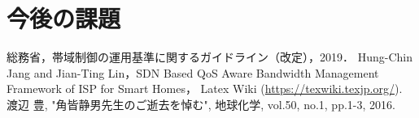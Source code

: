 \documentclass[a4paper,10pt,twocolumn,uplatex]{jsarticle}
\begin{document}
\section{今後の課題}

\footnotesize{
  \begin{thebibliography}{99}
     総務省，帯域制御の運用基準に関するガイドライン（改定），2019．
     Hung-Chin Jang and Jian-Ting Lin，SDN Based QoS Aware Bandwidth Management Framework of ISP for Smart Homes，
     Latex Wiki (\url{https://texwiki.texjp.org/}).
     渡辺 豊, "角皆静男先生のご逝去を悼む", 地球化学, vol.50, no.1, pp.1-3, 2016.
  \end{thebibliography}
}

\end{document}
